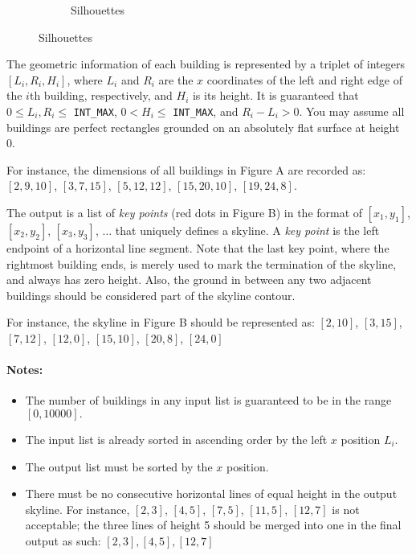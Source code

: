 \begin{figure}[H]
\begin{subfigure}[b]{8cm}
\caption{Silhouettes}
\end{subfigure}
\end{figure}
The geometric information of each building is represented by a triplet of integers $[L_i, R_i, H_i]$, where $L_i$ and $R_i$ are the $x$ coordinates of the left and right edge of the $i$th building, respectively, and $H_i$ is its height. It is guaranteed that $0 \leq L_i, R_i \leq$ \texttt{INT\_MAX}, $0 < H_i \leq$ \texttt{INT\_MAX}, and $R_i - L_i > 0$. You may assume all buildings are perfect rectangles grounded on an absolutely flat surface at height 0.
\par
For instance, the dimensions of all buildings in Figure A are recorded as:
$[2, 9, 10]$, $[3, 7, 15]$, $[5, 12, 12]$, $[15, 20, 10]$, $[19, 24, 8]$.
\par
The output is a list of \textit{key points} (red dots in Figure B) in the format of $[x_1,y_1]$, $[x_2, y_2]$, $[x_3, y_3]$, $\ldots$ that uniquely defines a skyline. A \textit{key point} is the left endpoint of a horizontal line segment. Note that the last key point, where the rightmost building ends, is merely used to mark the termination of the skyline, and always has zero height. Also, the ground in between any two adjacent buildings should be considered part of the skyline contour.
\par
For instance, the skyline in Figure B should be represented as:
$
[2, 10]$, $[3, 15]$, $[7, 12]$, $[12, 0]$, $[15 ,10]$, $[20, 8]$, $[24, 0]$

\paragraph{Notes:}
\begin{itemize}
    \item The number of buildings in any input list is guaranteed to be in the range $[0, 10000].$
    \item     The input list is already sorted in ascending order by the left $x$ position $L_i$.
    \item The output list must be sorted by the $x$ position.
    \item There must be no consecutive horizontal lines of equal height in the output skyline. For instance, $[2, 3]$, $[4, 5]$, $[7, 5]$, $[11, 5]$, $[12, 7]$ is not acceptable; the three lines of height 5 should be merged into one in the final output as such: $[2, 3], [4, 5], [12, 7]$
\end{itemize}
